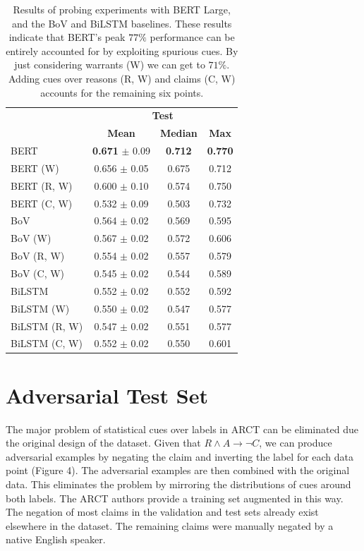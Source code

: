 \documentclass[11pt,a4paper]{article}
\begin{document}
\begin{table}[t]
\begin{center}
\small
\begin{tabular}{|l|ccc|}
\hline
\multirow{2}{*}{} & \multicolumn{3}{c|}{\textbf{Test}} \\
& \textbf{Mean} & \textbf{Median} & \textbf{Max} \\
\hline
BERT & \textbf{0.671} $\pm$ 0.09 & \textbf{0.712} & \textbf{0.770} \\
BERT (W) & 0.656 $\pm$ 0.05 & 0.675 & 0.712 \\
BERT (R, W) & 0.600 $\pm$ 0.10 & 0.574 & 0.750 \\
BERT (C, W) & 0.532 $\pm$ 0.09 & 0.503 & 0.732 \\
\hline
BoV & 0.564 $\pm$ 0.02 & 0.569 & 0.595 \\
BoV (W) & 0.567 $\pm$ 0.02 & 0.572 & 0.606 \\
BoV (R, W) & 0.554 $\pm$ 0.02 & 0.557 & 0.579 \\
BoV (C, W) & 0.545 $\pm$ 0.02 & 0.544 & 0.589 \\
\hline
BiLSTM & 0.552 $\pm$ 0.02 & 0.552 & 0.592 \\
BiLSTM (W) & 0.550 $\pm$ 0.02 & 0.547 & 0.577 \\
BiLSTM (R, W) & 0.547 $\pm$ 0.02 & 0.551 & 0.577 \\
BiLSTM (C, W) & 0.552 $\pm$ 0.02 & 0.550 & 0.601 \\
\hline
\end{tabular}
\end{center}
\caption{Results of probing experiments with BERT Large, and the BoV and BiLSTM baselines. These results indicate that BERT's peak $77\%$ performance can be entirely accounted for by exploiting spurious cues. By just considering warrants (W) we can get to $71\%$. Adding cues over reasons (R, W) and claims (C, W) accounts for the remaining six points.}
\end{table}

\section{Adversarial Test Set}

The major problem of statistical cues over labels in ARCT can be eliminated due the original design of the dataset. Given that $R \land A \rightarrow \lnot C$, we can produce adversarial examples by negating the claim and inverting the label for each data point (Figure 4). The adversarial examples are then combined with the original data. This eliminates the problem by mirroring the distributions of cues around both labels. The ARCT authors provide a training set augmented in this way. The negation of most claims in the validation and test sets already exist elsewhere in the dataset. The remaining claims were manually negated by a native English speaker.
\end{document}
